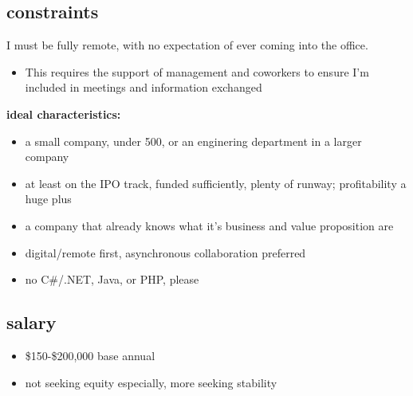 \documentclass[
]{article}
\providecommand{\tightlist}{%
  \setlength{\itemsep}{0pt}\setlength{\parskip}{0pt}}
\begin{document}
\newpage
\subsection{constraints}\label{constraints}

I must be fully remote, with no expectation of ever coming into the office.

\begin{itemize}
\tightlist
\item This requires the support of management and coworkers to ensure I'm included in meetings and information exchanged
\end{itemize}

\textbf{ideal characteristics:}

\begin{itemize}
\tightlist
\item a small company, under 500, or an enginering department in a larger company
\item at least on the IPO track, funded sufficiently, plenty of runway; profitability a huge plus
\item a company that already knows what it's business and value proposition are
\item digital/remote first, asynchronous collaboration preferred
\item no C\#/.NET, Java, or PHP, please
\end{itemize}

\subsection{salary}\label{salary}

\begin{itemize}
\tightlist
\item \$150-\$200,000 base annual
\item not seeking equity especially, more seeking stability
\end{itemize}
\end{document}

